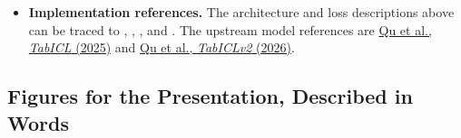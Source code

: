 \documentclass[11pt]{article}
\newenvironment{notes}
  {\begin{itemize}\setlength{\itemsep}{0.45em}\setlength{\parsep}{0pt}}
  {\end{itemize}}
\begin{document}
\begin{notes}
    \item \textbf{Implementation references.}
    The architecture and loss descriptions above can be traced
    to ,
    ,
    , and
    .
    The upstream model references are
    \href{https://arxiv.org/abs/2502.05564}{Qu et al.,
    \textit{TabICL} (2025)} and
    \href{https://arxiv.org/abs/2602.11139}{Qu et al.,
    \textit{TabICLv2} (2026)}.
\end{notes}

\subsection{Figures for the Presentation, Described in Words}
\label{sec:presentation-figure-description}
\end{document}
